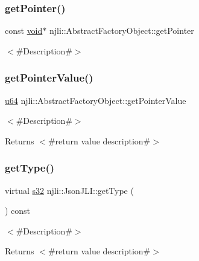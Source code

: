 \subsubsection{\texorpdfstring{get\+Pointer()}{getPointer()}}
{\footnotesize\ttfamily const \mbox{\hyperlink{_thread_8h_af1e856da2e658414cb2456cb6f7ebc66}{void}}$\ast$ njli\+::\+Abstract\+Factory\+Object\+::get\+Pointer}

$<$\#\+Description\#$>$ \mbox{\label{classnjli_1_1_json_j_l_i_a4ffddf141a426a5a07d0ac19f1913811}} 
\subsubsection{\texorpdfstring{get\+Pointer\+Value()}{getPointerValue()}}
{\footnotesize\ttfamily \mbox{\hyperlink{_util_8h_ad758b7a5c3f18ed79d2fcd23d9f16357}{u64}} njli\+::\+Abstract\+Factory\+Object\+::get\+Pointer\+Value}

$<$\#\+Description\#$>$

\begin{DoxyReturn}{Returns}
$<$\#return value description\#$>$ 
\end{DoxyReturn}
\mbox{\label{classnjli_1_1_json_j_l_i_afb825b630c4ee8489b270a189201ddac}} 
\subsubsection{\texorpdfstring{get\+Type()}{getType()}}
{\footnotesize\ttfamily virtual \mbox{\hyperlink{_util_8h_aa62c75d314a0d1f37f79c4b73b2292e2}{s32}} njli\+::\+Json\+J\+L\+I\+::get\+Type (\begin{DoxyParamCaption}{ }\end{DoxyParamCaption}) const\hspace{0.3cm}{\ttfamily [virtual]}}

$<$\#\+Description\#$>$

\begin{DoxyReturn}{Returns}
$<$\#return value description\#$>$ 
\end{DoxyReturn}


